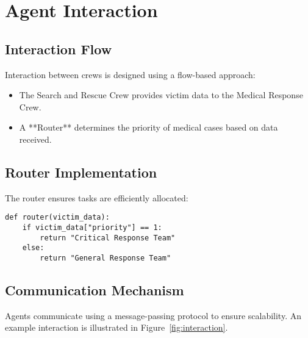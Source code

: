 \section{Agent Interaction}
\subsection{Interaction Flow}
Interaction between crews is designed using a flow-based approach:
\begin{itemize}
    \item The Search and Rescue Crew provides victim data to the Medical Response Crew.
    \item A **Router** determines the priority of medical cases based on data received.
\end{itemize}

\subsection{Router Implementation}
The router ensures tasks are efficiently allocated:
\begin{lstlisting}[caption={Router Implementation for Task Allocation}]
def router(victim_data):
    if victim_data["priority"] == 1:
        return "Critical Response Team"
    else:
        return "General Response Team"
\end{lstlisting}

\subsection{Communication Mechanism}
Agents communicate using a message-passing protocol to ensure scalability. An example interaction is illustrated in Figure~\ref{fig:interaction}.

\begin{comment}
\begin{figure}[H]
\centering
\texttt{[image: interaction\_flow.png]}
\caption{Interaction Flow Between Crews}
\label{fig:interaction}
\end{figure}
\end{comment}